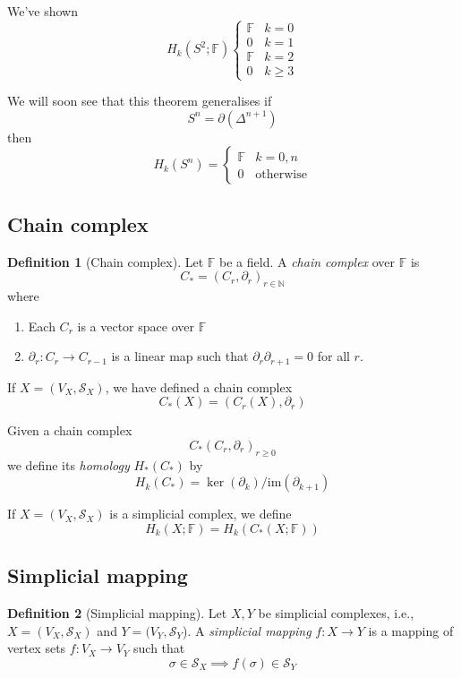 \documentclass[a4paper,14pt]{extarticle}
\theoremstyle{definition}
\newtheorem*{definition}{Definition}
\begin{document}
We've shown
\[ H_k(S^2;\mathbb{F})\begin{cases} 
			      \mathbb{F} & k=0 \\
			      0 & k=1 \\
			      \mathbb{F} & k=2 \\
			      0 & k\geq3
			   \end{cases}
\]

We will soon see that this theorem generalises if \[S^n=\partial(\Delta^{n+1})\] then \[H_k(S^n)=\begin{cases}\mathbb{F}&k=0,n\\0&\text{otherwise}\end{cases}\]

\subsection{Chain complex}
\begin{definition}[Chain complex]
	Let $\mathbb{F}$ be a field. A \emph{chain complex} over $\mathbb{F}$ is \[C_*=(C_r,\partial_r)_{r\in\mathbb{N}}\] where
	\begin{enumerate}
		\item Each $C_r$ is a vector space over $\mathbb{F}$
		\item $\partial_r:C_r\rightarrow C_{r-1}$ is a linear map such that $\partial_r\partial_{r+1}=0$ for all $r$.
	\end{enumerate}
\end{definition}

If $X=(V_X,\mathcal{S}_X)$, we have defined a chain complex \[C_*(X)=(C_r(X),\partial_r)\]

Given a chain complex \[C_*(C_r,\partial_r)_{r\geq0}\] we define its \emph{homology} $H_*(C_*)$ by \[H_k(C_*)=\ker(\partial_k)/\text{im}(\partial_{k+1})\]

If $X=(V_X,\mathcal{S}_X)$ is a simplicial complex, we define \[H_k(X;\mathbb{F})=H_k(C_*(X;\mathbb{F}))\]

\subsection{Simplicial mapping}
\begin{definition}[Simplicial mapping]
	Let $X,Y$ be simplicial complexes, i.e., $X=(V_X,\mathcal{S}_X)$ and $Y=(V_Y,\mathcal{S}_Y$). A \emph{simplicial mapping} $f:X\rightarrow Y$ is a mapping of vertex sets
	$f:V_X\rightarrow V_Y$ such that \[\sigma\in\mathcal{S}_X\implies f(\sigma)\in\mathcal{S}_Y\]
\end{definition}
\end{document}
